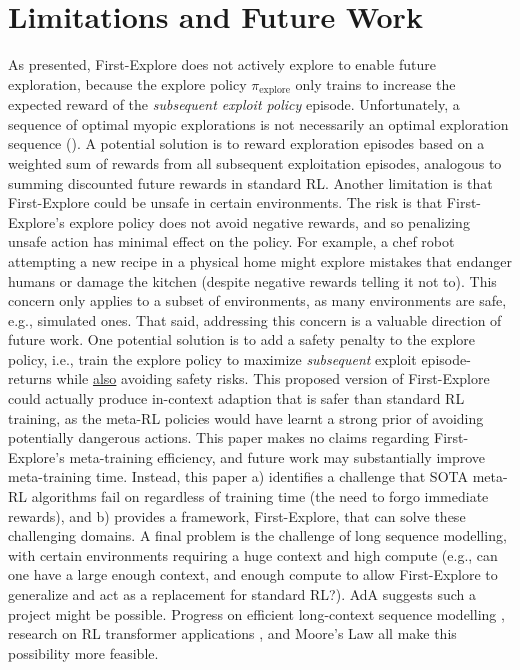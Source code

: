 \documentclass{article}
\begin{document}
\section{Limitations and Future Work} \label{limitations}
As presented, First-Explore does not actively explore to enable future exploration, because the explore policy \(\pi_{\text{explore}}\) only trains to increase the expected reward of the \emph{subsequent exploit policy} episode. Unfortunately, a sequence of optimal myopic explorations is not necessarily an optimal exploration sequence (). A potential solution is to reward exploration episodes based on a weighted sum of rewards from all subsequent exploitation episodes, analogous to summing discounted future rewards in standard RL.
Another limitation is that First-Explore could be unsafe in certain environments. The risk is that First-Explore's explore policy does not avoid negative rewards,
and so penalizing unsafe action has minimal effect on the policy. For example, a chef robot attempting a new recipe in a physical home might explore mistakes that endanger humans or damage the kitchen (despite negative rewards telling it not to). This concern only applies to a subset of environments, as many environments are safe, e.g., simulated ones. That said, addressing this concern is a valuable direction of future work.
One potential solution is to add a safety penalty to the explore policy, i.e., train the explore policy to maximize \emph{subsequent} exploit episode-returns while \underline{also} avoiding safety risks. This proposed version of First-Explore could actually produce in-context adaption that is safer than standard RL training, as the meta-RL policies would have learnt a strong prior of avoiding potentially dangerous actions.
This paper makes no claims regarding First-Explore’s meta-training efficiency, and future work may substantially improve meta-training time. Instead, this paper a) identifies a challenge that SOTA meta-RL algorithms fail on regardless of training time (the need to forgo immediate rewards), and b) provides a framework, First-Explore, that can solve these challenging domains.
A final problem is the challenge of long sequence modelling, with certain environments requiring a huge context and high compute (e.g., can one have a large enough context, and enough compute to allow First-Explore to generalize and act as a replacement for standard RL?). AdA \citep{adaptiveagentteam2023humantimescale} suggests such a project might be possible. Progress on efficient long-context sequence modelling \citep{tay2020long, gu2021efficiently}, research on RL transformer applications \citep{laskin2022incontext, chen2021decision}, and Moore's Law all make this possibility more feasible.
\end{document}
